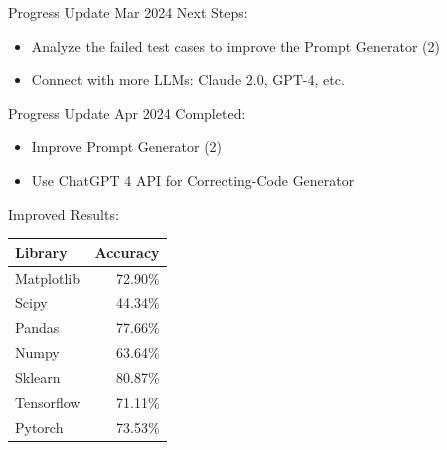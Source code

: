 \begin{frame}{Progress Update  Mar 2024}
    Next Steps:
    \begin{itemize}
        \item Analyze the failed test cases to improve the Prompt Generator (2)
        \item Connect with more LLMs: Claude 2.0, GPT-4, etc.
    \end{itemize}
\end{frame}

\begin{frame}{Progress Update  Apr 2024}
    Completed:
    \begin{itemize}
        \item Improve Prompt Generator (2)
        \item Use ChatGPT 4 API for Correcting-Code Generator
    \end{itemize}

    Improved Results:
    \begin{tabular}{lr}
        Library    & Accuracy \\
        \hline
        Matplotlib & 72.90\%  \\
        Scipy      & 44.34\%  \\
        Pandas     & 77.66\%  \\
        Numpy      & 63.64\%  \\
        Sklearn    & 80.87\%  \\
        Tensorflow & 71.11\%  \\
        Pytorch    & 73.53\%  \\
    \end{tabular}
\end{frame}
